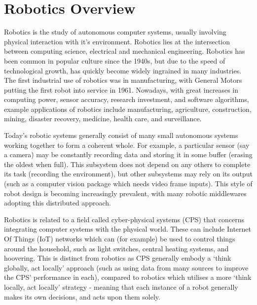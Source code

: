 \documentclass[../dissertation.tex]{subfiles}
\begin{document}
\section{Robotics Overview}
\label{background-robotics}

Robotics is the study of autonomous computer systems, usually involving physical interaction with it's environment. Robotics lies at the intersection between computing science, electrical and mechanical engineering. Robotics has been common in popular culture since the 1940s\cite{hockstein2007history}, but due to the speed of technological growth, has quickly become widely ingrained in many industries. The first industrial use of robotics was in manufacturing, with General Motors putting the first robot into service in 1961\cite{hagele2016ashorthistory}. Nowadays, with great increases in computing power, sensor accuracy, research investment, and software algorithms, example applications of robotics include manufacturing, agriculture, construction, mining, disaster recovery, medicine, health care, and surveillance\cite{hagele2016robotsatwork}.

Today's robotic systems generally consist of many small autonomous systems working together to form a coherent whole\cite{4058987}. For example, a particular sensor (say a camera) may be constantly recording data and storing it in some buffer (erasing the oldest when full). This subsystem does not depend on any others to complete its task (recording the environment), but other subsystems may rely on its output (such as a computer vision package which needs video frame inputs). This style of robot design is becoming increasingly prevalent, with many robotic middlewares adopting this distributed approach.

Robotics is related to a field called cyber-physical systems (CPS) that concerns integrating computer systems with the physical world\cite{Lee:EECS-2008-8}. These can include Internet Of Things (IoT) networks\cite{atzori2010internet} which can (for example) be used to control things around the household, such as light switches, central heating systems, and hoovering. This is distinct from robotics as CPS generally embody a `think globally, act locally' approach\cite{gordonthink} (such as using data from many sources to improve the CPS' performance in each), compared to robotics which utilises a more `think locally, act locally' strategy - meaning that each instance of a robot generally makes its own decisions, and acts upon them solely.
\end{document}
